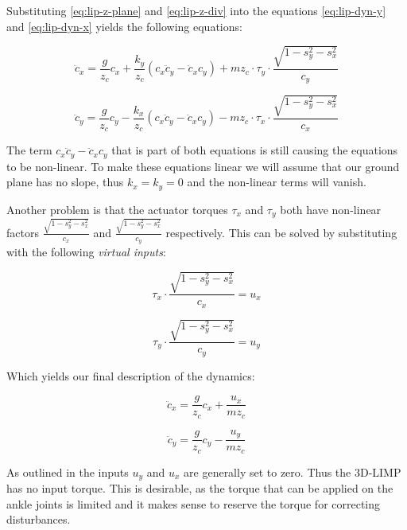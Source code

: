 \documentclass[english,ngerman]{KITreprt}
\begin{document}
Substituting \ref{eq:lip-z-plane} and \ref{eq:lip-z-div} into the
equations \ref{eq:lip-dyn-y} and \ref{eq:lip-dyn-x} yields the following
equations:

\begin{equation}
\ddot{c}_x = \frac{g}{z_c} c_x + \frac{k_y}{z_c} (c_x \ddot{c}_y - \ddot{c}_x c_y) + m z_c \cdot \tau_y \cdot \frac{\sqrt{1 - s_y^2 - s_x^2}}{c_y}
\end{equation}

\begin{equation}
\ddot{c}_y = \frac{g}{z_c} c_y - \frac{k_x}{z_c} (c_x \ddot{c}_y - \ddot{c}_x c_y) - m z_c \cdot \tau_x \cdot \frac{\sqrt{1 - s_y^2 - s_x^2}}{c_x}
\end{equation}

The term $c_x \ddot{c}_y - \ddot{c}_x c_y$ that is part of both
equations is still causing the equations to be non-linear. To make these
equations linear we will assume that our ground plane has no slope, thus
$k_x = k_y = 0$ and the non-linear terms will vanish.

Another problem is that the actuator torques $\tau_x$ and $\tau_y$ both
have non-linear factors $\frac{\sqrt{1 - s_y^2 - s_x^2}}{c_x}$ and
$\frac{\sqrt{1 - s_y^2 - s_x^2}}{c_y}$ respectively. This can be solved
by substituting with the following \emph{virtual inputs}:

\begin{equation}
\tau_x \cdot \frac{\sqrt{1 - s_y^2 - s_x^2}}{c_x} = u_x
\end{equation}

\begin{equation}
\tau_y \cdot \frac{\sqrt{1 - s_y^2 - s_x^2}}{c_y} = u_y
\end{equation}

Which yields our final description of the dynamics:

\begin{equation} \label{eq:lip-x}
\ddot{c}_x = \frac{g}{z_c} c_x + \frac{u_x}{m z_c}
\end{equation}

\begin{equation} \label{eq:lip-y}
\ddot{c}_y = \frac{g}{z_c} c_y - \frac{u_y}{m z_c}
\end{equation}

As outlined in \cite{kajita20013d} the inputs $u_y$ and $u_x$ are
generally set to zero. Thus the 3D-LIMP has no input torque. This is
desirable, as the torque that can be applied on the ankle joints is
limited and it makes sense to reserve the torque for correcting
disturbances.
\end{document}
